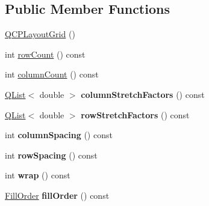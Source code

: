 \subsection*{Public Member Functions}
\begin{DoxyCompactItemize}
\item 
\hyperlink{class_q_c_p_layout_grid_ab2a4c1587dc8aed4c41c509c8d8d2a64}{Q\+C\+P\+Layout\+Grid} ()
\item 
int \hyperlink{class_q_c_p_layout_grid_af8e6c7a05864ebe610c87756c7b9079c}{row\+Count} () const 
\item 
int \hyperlink{class_q_c_p_layout_grid_ac39074eafd148b82d0762090f258189e}{column\+Count} () const 
\item 
\hyperlink{class_q_list}{Q\+List}$<$ double $>$ {\bfseries column\+Stretch\+Factors} () const \hypertarget{class_q_c_p_layout_grid_a39bd7994d00687d1b9defef6f1bda835}{}\label{class_q_c_p_layout_grid_a39bd7994d00687d1b9defef6f1bda835}

\item 
\hyperlink{class_q_list}{Q\+List}$<$ double $>$ {\bfseries row\+Stretch\+Factors} () const \hypertarget{class_q_c_p_layout_grid_a3744496abf73c8e3b464181d63bb20a7}{}\label{class_q_c_p_layout_grid_a3744496abf73c8e3b464181d63bb20a7}

\item 
int {\bfseries column\+Spacing} () const \hypertarget{class_q_c_p_layout_grid_a3de19753fdca81194458cb15156f7315}{}\label{class_q_c_p_layout_grid_a3de19753fdca81194458cb15156f7315}

\item 
int {\bfseries row\+Spacing} () const \hypertarget{class_q_c_p_layout_grid_abccdd33c1b284feb6df90fa02f23d9a3}{}\label{class_q_c_p_layout_grid_abccdd33c1b284feb6df90fa02f23d9a3}

\item 
int {\bfseries wrap} () const \hypertarget{class_q_c_p_layout_grid_aa7fc0bff4591a6be44af2fb038dd85d9}{}\label{class_q_c_p_layout_grid_aa7fc0bff4591a6be44af2fb038dd85d9}

\item 
\hyperlink{class_q_c_p_layout_grid_a7d49ee08773de6b2fd246edfed353cca}{Fill\+Order} {\bfseries fill\+Order} () const \hypertarget{class_q_c_p_layout_grid_a2ed8e2fc298652ec67d6a8848e58bad1}{}\label{class_q_c_p_layout_grid_a2ed8e2fc298652ec67d6a8848e58bad1}


\end{DoxyCompactItemize}
